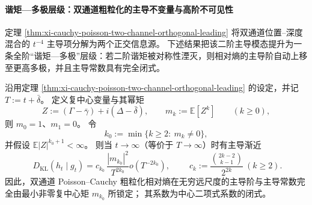 \paragraph{谐矩—多极层级：双通道粗粒化的主导不变量与高阶不可见性}
定理 \ref{thm:xi-cauchy-poisson-two-channel-orthogonal-leading} 将双通道位置–深度混合的 \(t^{-4}\) 主导项分解为两个正交信息源。
下述结果把该二阶主导模态提升为一条全阶“谐矩—多极”层级：若二阶谐矩被对称性湮灭，则相对熵的主导阶自动上移至更高多极，并且主导常数具有完全闭式。

\begin{theorem}\label{thm:xi-poisson-cauchy-harmonic-moment-multipole-kl}
沿用定理 \ref{thm:xi-cauchy-poisson-two-channel-orthogonal-leading} 的设定，并记
\(
T:=t+\bar\delta
\)。
定义复中心变量与其幂矩
\[
Z:=(\Gamma-\bar\gamma)+i(\Delta-\bar\delta),
\qquad
m_k:=\mathbb E[Z^k]\qquad(k\ge 0),
\]
则 \(m_0=1\)、\(m_1=0\)。
令
\[
k_0:=\min\{k\ge 2:\ m_k\neq 0\},
\]
并假设 \(\mathbb E|Z|^{k_0+1}<\infty\)。
则当 \(t\to\infty\)（等价于 \(T\to\infty\)）时有主导渐近
\begin{equation}\label{eq:xi-poisson-cauchy-harmonic-moment-multipole-kl}
\boxed{\;
D_{\mathrm{KL}}(h_t\mid g_t)
=c_{k_0}\,\frac{|m_{k_0}|^2}{T^{2k_0}}
o\!\left(T^{-2k_0}\right),\;}
\qquad
c_k:=\frac{\binom{2k-2}{k-1}}{2^{2k}}\ (k\ge 2).
\end{equation}
因此，双通道 Poisson--Cauchy 粗粒化相对熵在无穷远尺度的主导阶与主导常数完全由最小非零复中心矩 \(m_{k_0}\) 所锁定；
其系数为中心二项式系数的闭式。
\end{theorem}
